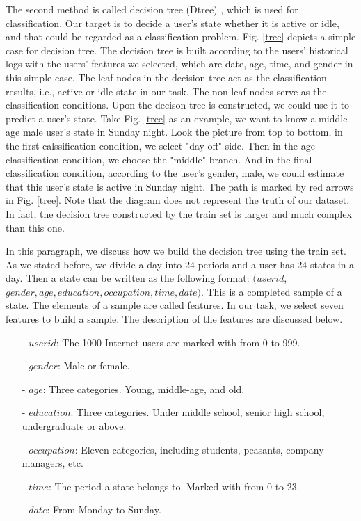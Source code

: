 \documentclass[journal]{IEEEtran}
\begin{document}
The second method is called decision tree (Dtree) \cite{Kotsiantis2013}, which is used for classification. Our target is to decide a user's state whether it is active or idle, and that could be regarded as a classification problem. Fig. \ref{tree} depicts a simple case for decision tree. The decision tree is built according to the users' historical logs with the users' features we selected, which are date, age, time, and gender in this simple case. The leaf nodes in the decision tree act as the classification results, i.e., active or idle state in our task. The non-leaf nodes serve as the classification conditions. Upon the decison tree is constructed, we could use it to predict a user's state. Take Fig. \ref{tree} as an example, we want to know a middle-age male user's state in Sunday night. Look the picture from top to bottom, in the first calssification condition, we select "day off" side. Then in the age classification condition, we choose the "middle" branch. And in the final classification condition, according to the user's gender, male, we could estimate that this user's state is active in Sunday night. The path is marked by red arrows in Fig. \ref{tree}. Note that the diagram does not represent the truth of our dataset. In fact, the decision tree constructed by the train set is larger and much complex than this one. 

In this paragraph, we discuss how we build the decision tree using the train set. As we stated before, we divide a day into 24 periods and a user has 24 states in a day. Then a state can be written as the following format: $(user$\textunderscore $id$, $gender, age, education, occupation, time, date)$. This is a completed sample of a state. The elements of a sample are called features. In our task, we select seven features to build a sample. The description of the features are discussed below.

\begin{itemize}
  \item[-] $user$\textunderscore $id$: The 1000 Internet users are marked with from 0 to 999.
  \item[-] $gender$: Male or female.
  \item[-] $age$: Three categories. Young, middle-age, and old.
  \item[-] $education$: Three categories. Under middle school, senior high school, undergraduate or above.
  \item[-] $occupation$: Eleven categories, including students, peasants, company managers, etc.
  \item[-] $time$: The period a state belongs to. Marked with from 0 to 23.
  \item[-] $date$: From Monday to Sunday.
\end{itemize}
\end{document}
